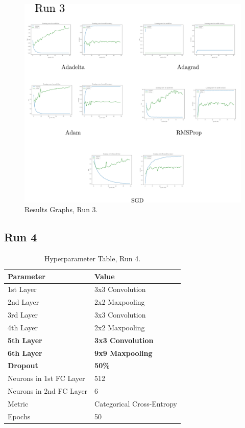 \documentclass[report, 11pt, oneside]{dissertation}
\begin{document}
\begin{figure}[H]
   \centering
	\includegraphics[scale=0.20]{figure_33.pdf}
	\caption{Results Graphs, Run 3.}
	\label{fig:results_graphs_3}
\end{figure}

\subsection{Run 4}

\begin{table}[H]
\centering
	\begin{tabular}{|l|l|}
		\hline
		Parameter               & Value                     \\ \hline
		1st Layer               & 3x3 Convolution           \\ \hline
		2nd Layer               & 2x2 Maxpooling            \\ \hline
		3rd Layer               & 3x3 Convolution           \\ \hline
		4th Layer               & 2x2 Maxpooling            \\ \hline
		\textbf{5th Layer}      & \textbf{3x3 Convolution}  \\ \hline
		\textbf{6th Layer}      & \textbf{9x9 Maxpooling}   \\ \hline
		\textbf{Dropout}        & \textbf{50\%}             \\ \hline
		Neurons in 1st FC Layer & 512                       \\ \hline
		Neurons in 2nd FC Layer & 6                         \\ \hline
		Metric                  & Categorical Cross-Entropy \\ \hline
		Epochs                  & 50                        \\ \hline
	\end{tabular}
	\caption{Hyperparameter Table, Run 4.}
	\label{tab:parameters_4}
\end{table}
\end{document}
